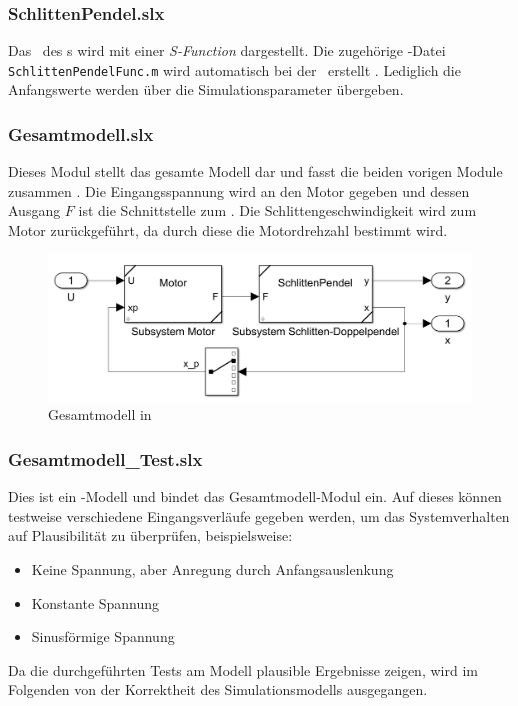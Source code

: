 \subsubsection{SchlittenPendel.slx}
Das \zrm\ des \spds s wird mit einer \emph{S-Function} dargestellt.
Die zugehörige \ml-Datei \texttt{SchlittenPendelFunc.m} wird automatisch bei der \init\ erstellt .
Lediglich die Anfangswerte werden über die Simulationsparameter übergeben.

\subsubsection{Gesamtmodell.slx}\label{sec:gesamtslx}
Dieses Modul stellt das gesamte Modell dar und fasst die beiden vorigen Module zusammen .
Die Eingangsspannung wird an den Motor gegeben und dessen Ausgang $F$ ist die Schnittstelle zum \sdpd.
Die Schlittengeschwindigkeit wird zum Motor zurückgeführt, da durch diese die Motordrehzahl bestimmt wird.

\begin{figure}[h]
	\centering
		\includegraphics[scale=0.4]{Bilder/Simulink/gesamtmodell.PNG}
	\caption{Gesamtmodell in \sm}
	\label{fig:simges}
\end{figure}

\subsubsection{Gesamtmodell\_Test.slx}
Dies ist ein \sm-Modell und bindet das Gesamtmodell-Modul ein.
Auf dieses können testweise verschiedene Eingangsverläufe gegeben werden, um das Systemverhalten auf Plausibilität zu überprüfen, beispielsweise:
\begin{itemize}
	\item Keine Spannung, aber Anregung durch Anfangsauslenkung
	\item Konstante Spannung
	\item Sinusförmige Spannung
\end{itemize}
Da die durchgeführten Tests am Modell plausible Ergebnisse zeigen, wird im Folgenden von der Korrektheit des Simulationsmodells ausgegangen.


